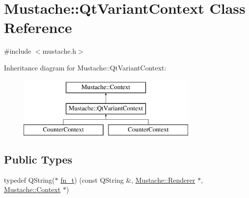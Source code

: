 \hypertarget{classMustache_1_1QtVariantContext}{}\section{Mustache\+:\+:Qt\+Variant\+Context Class Reference}
\label{classMustache_1_1QtVariantContext}


{\ttfamily \#include $<$mustache.\+h$>$}

Inheritance diagram for Mustache\+:\+:Qt\+Variant\+Context\+:\begin{figure}[H]
\begin{center}
\leavevmode
\includegraphics[height=3.000000cm]{d5/d8b/classMustache_1_1QtVariantContext}
\end{center}
\end{figure}
\subsection*{Public Types}
\begin{DoxyCompactItemize}
\item 
typedef Q\+String($\ast$ \hyperlink{classMustache_1_1QtVariantContext_a7cbe08798c8b9516223c380087f82e7b}{fn\+\_\+t}) (const Q\+String \&, \hyperlink{classMustache_1_1Renderer}{Mustache\+::\+Renderer} $\ast$, \hyperlink{classMustache_1_1Context}{Mustache\+::\+Context} $\ast$)
\end{DoxyCompactItemize}
